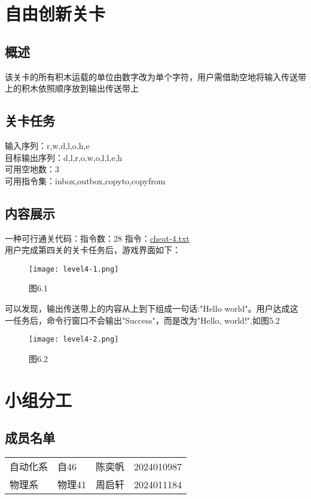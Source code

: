\documentclass{report}
\begin{document}
    \chapter{自由创新关卡}
    \section{概述}
    该关卡的所有积木运载的单位由数字改为单个字符，用户需借助空地将输入传送带上的积木依照顺序放到输出传送带上
    \section{关卡任务}\noindent
    输入序列：\hspace{3em}r\;,\;w\;,\;d\;,\;l\;,\;o\;,\;h\;,\;e\\
    目标输出序列：\hspace{1em}d\;,\;l\;,\;r\;,\;o\;,\;w\;,\;o\;,\;l\;,\;l\;,\;e\;,\;h\\
    可用空地数：\hspace{2em}3\\
    可用指令集：\hspace{2em}inbox\;,\;outbox\;,\;copyto\;,\;copyfrom
    \section{内容展示}\noindent
    一种可行通关代码：\quad 指令数：28 \quad 指令：\href{https://github.com/Wallfacer-04/HUMAN-RESOURCE-MACHINE/blob/main/cheat-4.txt}{cheat-4.txt}\\
    用户完成第四关的关卡任务后，游戏界面如下：
    \begin{figure}[htbp]
        \centering
        \texttt{[image: level4-1.png]}
        \caption*{图6.1}
    \end{figure}\newpage
    可以发现，输出传送带上的内容从上到下组成一句话:"Hello world"。用户达成这一任务后，命令行窗口不会输出"Success"，而是改为"Hello, world!",如图5.2\\
    \begin{figure}[htbp]
        \centering
        \texttt{[image: level4-2.png]}
        \caption*{图6.2}
    \end{figure}

    

    \chapter{小组分工}
    \section{成员名单}\noindent
    \begin{tabular}{llll}
        自动化系 & 自46 & 陈奕帆 & 2024010987 \\
        物理系 & 物理41 & 周启轩 & 2024011184 
        \end{tabular}
\end{document}
